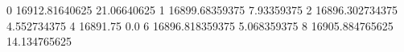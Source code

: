 0 16912.81640625 21.06640625
1 16899.68359375 7.93359375
2 16896.302734375 4.552734375
4 16891.75 0.0
6 16896.818359375 5.068359375
8 16905.884765625 14.134765625
